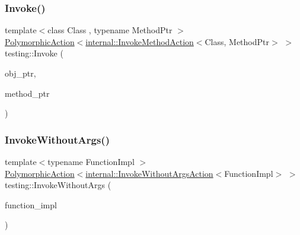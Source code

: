 \mbox{\label{namespacetesting_a80b82dc382445d240ff011f9c34aefc4}} 
\subsubsection{\texorpdfstring{Invoke()}{Invoke()}\hspace{0.1cm}{\footnotesize\ttfamily [2/2]}}
{\footnotesize\ttfamily template$<$class Class , typename Method\+Ptr $>$ \\
\mbox{\hyperlink{classtesting_1_1PolymorphicAction}{Polymorphic\+Action}}$<$\mbox{\hyperlink{classtesting_1_1internal_1_1InvokeMethodAction}{internal\+::\+Invoke\+Method\+Action}}$<$Class, Method\+Ptr$>$ $>$ testing\+::\+Invoke (\begin{DoxyParamCaption}\item[{Class $\ast$}]{obj\+\_\+ptr,  }\item[{Method\+Ptr}]{method\+\_\+ptr }\end{DoxyParamCaption})}

\mbox{\label{namespacetesting_a88cc1999296bc630f6a49cdf66bb21f9}} 
\subsubsection{\texorpdfstring{InvokeWithoutArgs()}{InvokeWithoutArgs()}\hspace{0.1cm}{\footnotesize\ttfamily [1/2]}}
{\footnotesize\ttfamily template$<$typename Function\+Impl $>$ \\
\mbox{\hyperlink{classtesting_1_1PolymorphicAction}{Polymorphic\+Action}}$<$\mbox{\hyperlink{classtesting_1_1internal_1_1InvokeWithoutArgsAction}{internal\+::\+Invoke\+Without\+Args\+Action}}$<$Function\+Impl$>$ $>$ testing\+::\+Invoke\+Without\+Args (\begin{DoxyParamCaption}\item[{Function\+Impl}]{function\+\_\+impl }\end{DoxyParamCaption})}

\mbox{\label{namespacetesting_ab75325d71a8c37db94f349243815c728}} 
